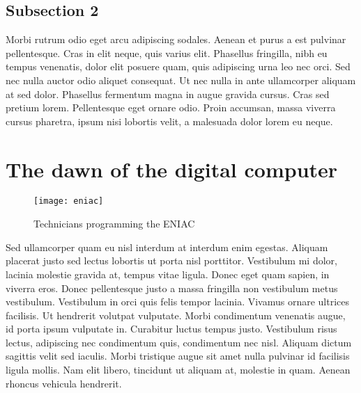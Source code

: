 
\subsection{Subsection 2}
Morbi rutrum odio eget arcu adipiscing sodales. Aenean et purus a est pulvinar pellentesque. Cras in elit neque, quis varius elit. Phasellus fringilla, nibh eu tempus venenatis, dolor elit posuere quam, quis adipiscing urna leo nec orci. Sed nec nulla auctor odio aliquet consequat. Ut nec nulla in ante ullamcorper aliquam at sed dolor. Phasellus fermentum magna in augue gravida cursus. Cras sed pretium lorem. Pellentesque eget ornare odio. Proin accumsan, massa viverra cursus pharetra, ipsum nisi lobortis velit, a malesuada dolor lorem eu neque.


\section{The dawn of the digital computer}

\begin{figure}[ht]
    \centering
    \texttt{[image: eniac]}
    \caption{Technicians programming the ENIAC \cite{LosAlamosNationalLaboratory}}
    \label{fig:eniac}
\end{figure}

Sed ullamcorper quam eu nisl interdum at interdum enim egestas. Aliquam placerat justo sed lectus lobortis ut porta nisl porttitor. Vestibulum mi dolor, lacinia molestie gravida at, tempus vitae ligula. Donec eget quam sapien, in viverra eros. Donec pellentesque justo a massa fringilla non vestibulum metus vestibulum. Vestibulum in orci quis felis tempor lacinia. Vivamus ornare ultrices facilisis. Ut hendrerit volutpat vulputate. Morbi condimentum venenatis augue, id porta ipsum vulputate in. Curabitur luctus tempus justo. Vestibulum risus lectus, adipiscing nec condimentum quis, condimentum nec nisl. Aliquam dictum sagittis velit sed iaculis. Morbi tristique augue sit amet nulla pulvinar id facilisis ligula mollis. Nam elit libero, tincidunt ut aliquam at, molestie in quam. Aenean rhoncus vehicula hendrerit.

